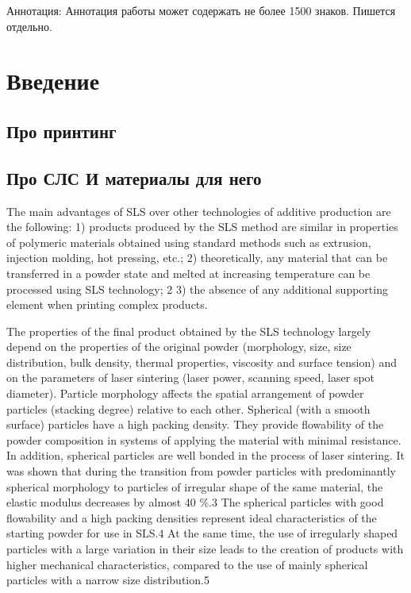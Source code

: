 \documentclass[oneside,final,14pt]{extreport}
\begin{document}
	
	
	
	
	Аннотация: Аннотация работы может содержать не более 1500 знаков. Пишется отдельно.
	
	\tableofcontents
	
	\chapter*{Введение}
	
	\section{Про принтинг}
	




\section{Про СЛС И материалы для него}
The main advantages of SLS over other technologies of additive production are the following: 1) products produced by the SLS method are similar in properties of polymeric materials obtained using standard methods such as extrusion, injection molding, hot pressing, etc.; 2) theoretically, any material that can be transferred in a powder state and melted at increasing temperature can be processed using SLS technology; 2 3) the absence of any additional supporting element when printing complex products.

The properties of the final product obtained by the SLS technology largely depend on the properties of the original powder (morphology, size, size distribution, bulk density, thermal properties, viscosity and surface tension) and on the parameters of laser sintering (laser power, scanning speed, laser spot diameter). Particle morphology affects the spatial arrangement of powder particles (stacking degree) relative to each other. Spherical (with a smooth surface) particles have a high packing density. They provide flowability of the powder composition in systems of applying the material with minimal resistance. In addition, spherical particles are well bonded in the process of laser sintering. It was shown that during the transition from powder particles with predominantly spherical morphology to particles of irregular shape of the same material, the elastic modulus decreases by almost 40 \%.3 The spherical particles with good flowability and a high packing densities represent ideal characteristics of the starting powder for use in SLS.4 At the same time, the use of irregularly shaped particles with a large variation in their size leads to the creation of products with higher mechanical characteristics, compared to the use of mainly spherical particles with a narrow size distribution.5
	
\end{document}
